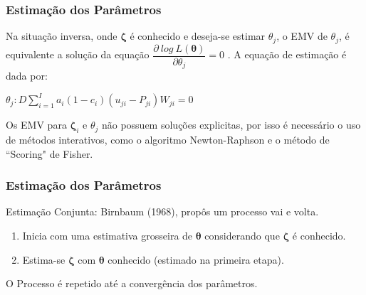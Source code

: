 \documentclass{beamer}
\begin{document}
	\begin{frame}
		
		\frametitle{Estimação dos Parâmetros }
		
		Na situação inversa,  onde $\boldsymbol{\zeta}$ é conhecido e deseja-se estimar $ \theta_j $, o EMV de $\theta_j$, é equivalente a solução da equação
		$\dfrac{\partial~log~ L(\boldsymbol{\theta})}{\partial \theta_j} = 0$ .
		A equação de estimação é dada por:\newline \newline
		
		
		$ \theta_j : D\sum_{i=1}^{I}{a_i(1-c_i)(u_{ji}-P_{ji})W_{ji}} = 0 $ \newline \newline
		
		Os EMV para $ \boldsymbol{\zeta}_i$ e $\theta_j$ não possuem soluções explicitas, por isso é necessário o uso de métodos interativos,  como o algoritmo Newton-Raphson e o método de ``Scoring" de Fisher.
		
	\end{frame}
	
	\begin{frame}
		
		\frametitle{Estimação dos Parâmetros }
		
		Estimação Conjunta: Birnbaum (1968), propôs um processo vai e volta.\newline
		
		\begin{enumerate}
			\item Inicia com uma estimativa grosseira de $\boldsymbol{\theta}$ considerando que $\boldsymbol{\zeta}$ é conhecido.
			\item Estima-se $\boldsymbol{\zeta}$ com $\boldsymbol{\theta}$ conhecido (estimado na primeira etapa).\newline 
		\end{enumerate} 
		
		O Processo é repetido até a convergência dos parâmetros.
		
	\end{frame}
	
\end{document}
